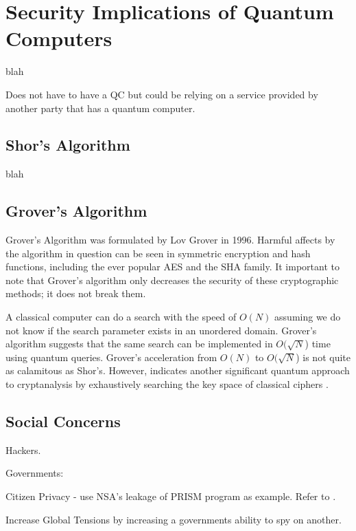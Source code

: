 \section{Security Implications of Quantum Computers}
blah

Does not have to have a QC but could be relying on a service provided by another party that has a quantum computer.

\subsection{Shor's Algorithm}
blah

\subsection{Grover's Algorithm}
Grover's Algorithm was formulated by Lov Grover in 1996. Harmful affects by the algorithm in question can be seen in symmetric encryption and hash functions, including the ever popular AES and the SHA family. It important to note that Grover's algorithm only decreases the security of these cryptographic methods; it does not break them.

A classical computer can do a search with the speed of \(O(N)\) assuming we do not know if the search parameter exists in an unordered domain. Grover's algorithm suggests that the same search can be implemented in \(O(\sqrt{N}\)) time using quantum queries. Grover's acceleration from \(O(N)\) to \(O(\sqrt{N}\)) is not quite as calamitous as Shor's. However, indicates another significant quantum approach to cryptanalysis by exhaustively searching the key space of classical ciphers \cite{Quantum_Cryptanal}.



\subsection{Social Concerns}
Hackers.

Governments:

Citizen Privacy - use NSA's leakage of PRISM program as example. Refer to \cite{Sec_Risk}.
    
Increase Global Tensions by increasing a governments ability to spy on another. 

    